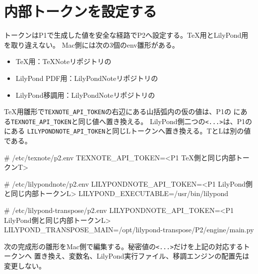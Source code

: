 \documentclass[uplatex,a4paper,11pt]{jsarticle}
\begin{document}



\section{内部トークンを設定する}

トークンはP1で生成した値を安全な経路でP2へ設定する。TeX用とLilyPond用を取り違えない。
Mac側には次の3個のenv雛形がある。

\begin{itemize}
  \item TeX用：TeXNoteリポジトリの
  \item LilyPond PDF用：LilyPondNoteリポジトリの
  \item LilyPond移調用：LilyPondNoteリポジトリの
\end{itemize}

TeX用雛形で\texttt{TEXNOTE\_API\_TOKEN}の右辺にある山括弧内の仮の値は、P1の
にある\texttt{TEXNOTE\_API\_TOKEN}と同じ値へ置き換える。
LilyPond側二つの\texttt{<...>}は、P1のにある
\texttt{LILYPONDNOTE\_API\_TOKEN}と同じLトークンへ置き換える。TとLは別の値である。

\begin{command}
# /etc/texnote/p2.env
TEXNOTE_API_TOKEN=<P1 TeX側と同じ内部トークンT>

# /etc/lilypondnote/p2.env
LILYPONDNOTE_API_TOKEN=<P1 LilyPond側と同じ内部トークンL>
LILYPOND_EXECUTABLE=/usr/bin/lilypond

# /etc/lilypond-transpose/p2.env
LILYPONDNOTE_API_TOKEN=<P1 LilyPond側と同じ内部トークンL>
LILYPOND_TRANSPOSE_MAIN=/opt/lilypond-transpose/P2/engine/main.py
\end{command}

次の完成形の雛形をMac側で編集する。秘密値の\texttt{<...>}だけを上記の対応するトークンへ
置き換え、変数名、LilyPond実行ファイル、移調エンジンの配置先は変更しない。




\end{document}
